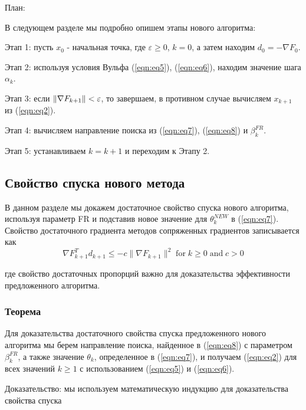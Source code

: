 \noindent План:

\noindent В следующем разделе мы подробно опишем этапы нового алгоритма:

\noindent Этап 1: пусть $x_{0}$ - начальная точка, где $\varepsilon \ge 0$, $k = 0$, 
а затем находим $ d_{0} = -\nabla F_{0} $.

\noindent Этап 2: используя условия Вульфа (\ref{eqn:eq5}), (\ref{eqn:eq6}),
находим значение шага $ \alpha_{k} $.

\noindent Этап 3: если $ \|{\cal \nabla}F_{k+1}\|<\varepsilon $, то завершаем, в
противном случае вычисляем $ x_{k+1} $ из (\ref{eqn:eq2}).

\noindent Этап 4: вычисляем направление поиска из (\ref{eqn:eq7}),
(\ref{eqn:eq8}) и $ \beta_{k}^{FR} $.

\noindent Этап 5: устанавливаем $ k = k + 1 $ и переходим к Этапу 2.

\subsection{Свойство спуска нового метода}

В данном разделе мы докажем достаточное свойство спуска нового алгоритма,
используя параметр FR и подставив новое значение для $\theta_{k}^{NEW}$ в
(\ref{eqn:eq7}). Свойство достаточного градиента методов сопряженных градиентов
записывается как
\begin{equation}\label{eqn:eq9}
    \nabla F_{k+1}^{T}d_{k+1}\leq-c\|\nabla F_{k+1}\|^{2}\;\mathrm{for}\;k\geq0\;\mathrm{and}\;c>0
\end{equation}

где свойство достаточных пропорций важно для доказательства эффективности
предложенного алгоритма.

\subsubsection{Теорема}

Для доказательства достаточного свойства спуска предложенного нового алгоритма
мы берем направление поиска, найденное в (\ref{eqn:eq8}) с параметром $\beta_{k}^{FR}$, а
также значение $\theta_{k}$, определенное в (\ref{eqn:eq7}), и получаем (\ref{eqn:eq2}) для всех
значений $k \geq 1$ с использованием (\ref{eqn:eq5}) и (\ref{eqn:eq6}).

\noindent Доказательство: мы используем математическую индукцию для
доказательства свойства спуска

